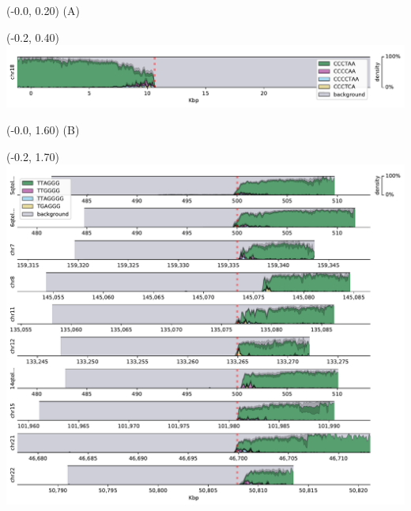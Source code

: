 \documentclass{article}
\begin{document}
\begin{textblock}{13}(-0.0,  0.20) \LARGE{(A)} \end{textblock}
\begin{textblock}{13}(-0.2,  0.40) \includegraphics[width=.6\textwidth,keepaspectratio]{densityplots/HG003-densityplot-p_arm.pdf}   \end{textblock}

\begin{textblock}{13}(-0.0,  1.60) \LARGE{(B)} \end{textblock}
\begin{textblock}{13}(-0.2,  1.70) \includegraphics{densityplots/HG003-densityplot-q_arm.pdf}   \end{textblock}
\end{document}
